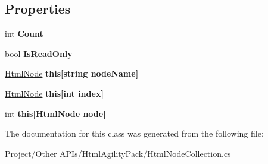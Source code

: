\subsection*{Properties}
\begin{DoxyCompactItemize}
\item 
\mbox{\label{class_html_agility_pack_1_1_html_node_collection_a1cadc0dea140098ebd0fa154aff5756a}} 
int {\bfseries Count}
\item 
\mbox{\label{class_html_agility_pack_1_1_html_node_collection_ac1b91d87ba873bfd722272b97eb24a41}} 
bool {\bfseries Is\+Read\+Only}
\item 
\mbox{\label{class_html_agility_pack_1_1_html_node_collection_a768bfd4cb14d7e0a84b0b85baa3687fb}} 
\hyperlink{class_html_agility_pack_1_1_html_node}{Html\+Node} {\bfseries this\mbox{[}string node\+Name\mbox{]}}
\item 
\mbox{\label{class_html_agility_pack_1_1_html_node_collection_a999ccc9db0cc0a9ed91c2a29a937b74d}} 
\hyperlink{class_html_agility_pack_1_1_html_node}{Html\+Node} {\bfseries this\mbox{[}int index\mbox{]}}
\item 
\mbox{\label{class_html_agility_pack_1_1_html_node_collection_a5f24c5fdf331d11c1137c5ce404b2551}} 
int {\bfseries this\mbox{[}\+Html\+Node node\mbox{]}}
\end{DoxyCompactItemize}


The documentation for this class was generated from the following file\+:\begin{DoxyCompactItemize}
\item 
Project/\+Other A\+P\+Is/\+Html\+Agility\+Pack/Html\+Node\+Collection.\+cs\end{DoxyCompactItemize}
